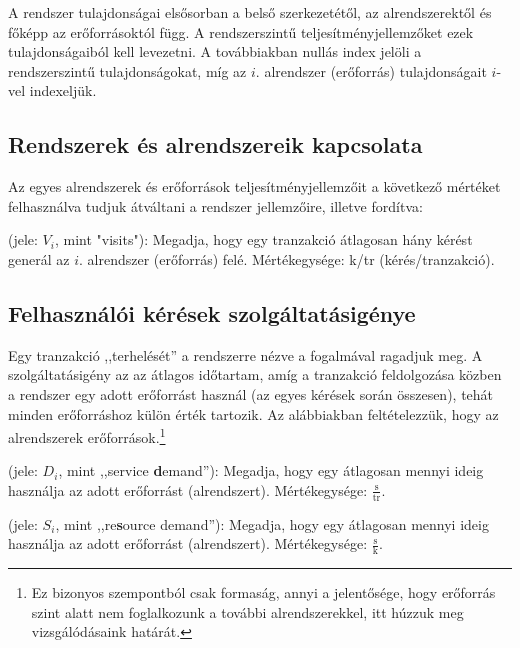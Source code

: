A rendszer tulajdonságai elsősorban a belső szerkezetétől, az alrendszerektől és főképp az erőforrásoktól függ. A rendszerszintű teljesítményjellemzőket ezek tulajdonságaiból kell levezetni. A továbbiakban nullás index jelöli a rendszerszintű tulajdonságokat, míg az $i.$ alrendszer (erőforrás) tulajdonságait $i$-vel indexeljük.

\subsection{Rendszerek és alrendszereik kapcsolata}

Az egyes alrendszerek és erőforrások teljesítményjellemzőit a következő mértéket felhasználva tudjuk átváltani a rendszer jellemzőire, illetve fordítva:

\begin{definicio}
 (jele: $V_i$, mint "visits"): Megadja, hogy egy tranzakció átlagosan hány kérést generál az $i.$ alrendszer (erőforrás) felé. Mértékegysége: k/tr (kérés/tranzakció).
\end{definicio}

\subsection{Felhasználói kérések szolgáltatásigénye}

Egy tranzakció ,,terhelését'' a rendszerre nézve a  fogalmával ragadjuk meg. A szolgáltatásigény az az átlagos időtartam, amíg a tranzakció feldolgozása közben a rendszer egy adott erőforrást használ (az egyes kérések során összesen), tehát minden erőforráshoz külön érték tartozik. Az alábbiakban feltételezzük, hogy az alrendszerek erőforrások.\footnote{Ez bizonyos szempontból csak formaság, annyi a jelentősége, hogy erőforrás szint alatt nem foglalkozunk a további alrendszerekkel, itt húzzuk meg vizsgálódásaink határát.}


\begin{definicio}
	 (jele: $D_i$, mint ,,service \textbf{d}emand''): Megadja, hogy egy  átlagosan mennyi ideig használja az adott erőforrást (alrendszert). Mértékegysége: $\frac{\mathrm{s}}{\mathrm{tr}}$.
\end{definicio}

\begin{definicio}
	 (jele: $S_i$, mint ,,re\textbf{s}ource demand''): Megadja, hogy egy  átlagosan mennyi ideig használja az adott erőforrást (alrendszert). Mértékegysége: $\frac{\mathrm{s}}{\mathrm{k}}$.
\end{definicio}

